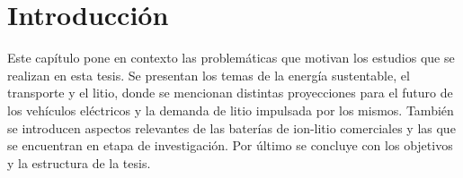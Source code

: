 \chapter{Introducción}\label{ch:introduccion}
\thispagestyle{empty}

\vspace{50pt}

\begin{adjustwidth}{50pt}{50pt}
    Este capítulo pone en contexto las problemáticas que motivan los estudios
    que se realizan en esta tesis. Se presentan los temas de la energía sustentable, el 
    transporte y el litio, donde se mencionan distintas proyecciones para el 
    futuro de los vehículos eléctricos y la demanda de litio impulsada por 
    los mismos. También se introducen aspectos relevantes de las baterías de
    ion-litio comerciales y las que se encuentran en etapa de investigación.
    Por último se concluye con los objetivos y la estructura de la tesis.
\end{adjustwidth}

\clearpage
\newpage
\thispagestyle{empty}
\mbox{}
\newpage








